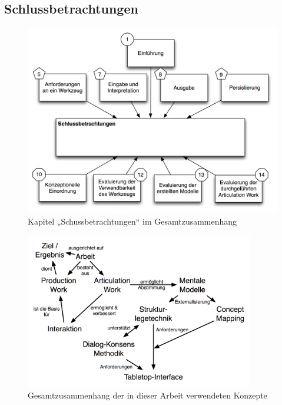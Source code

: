 \part*{}

\chapter{Schlussbetrachtungen} %
\label{cha:schlussbetrachtungen}

\begin{figure}[htbp]
	\centering
		\includegraphics[scale=0.7]{img/Kontextgrafiken/k15.png}
	\caption{Kapitel „Schussbetrachtungen“ im Gesamtzusammenhang}
	\label{fig:img_Kontextgrafiken_k15}
\end{figure}


\begin{figure}[htbp]
	\centering
		\includegraphics[width=10cm]{img/Schlussbetrachtungen/ArbeitInteraktionMentaleModelleTabletop.png}
	\caption{Gesamtzusammenhang der in dieser Arbeit verwendeten Konzepte}
	\label{fig:img_Schlussbetrachtungen_ArbeitInteraktionMentaleModelleTabletop}
\end{figure}

